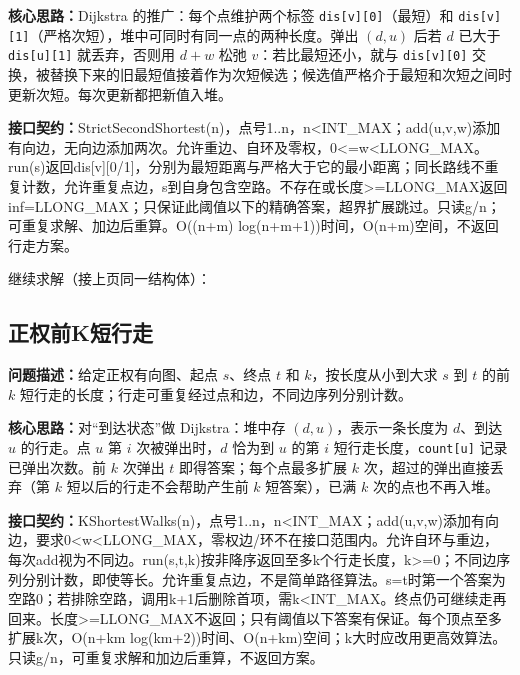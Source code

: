 \textbf{核心思路：}\allowbreak Dijkstra 的推广：每个点维护两个标签 \texttt{dis[v][0]}（最短）和 \texttt{dis[v][1]}（严格次短），堆中可同时有同一点的两种长度。弹出 $(d,u)$ 后若 $d$ 已大于 \texttt{dis[u][1]} 就丢弃，否则用 $d+w$ 松弛 $v$：若比最短还小，就与 \texttt{dis[v][0]} 交换，被替换下来的旧最短值接着作为次短候选；候选值严格介于最短和次短之间时更新次短。每次更新都把新值入堆。



{\sloppy{}\noindent\textbf{接口契约：}StrictSecondShortest(n)，点号1..n，n<INT\_MAX；add(u,v,w)添加有向边，无向边添加两次。允许重边、自环及零权，0<=w<LLONG\_MAX。run(s)返回dis[v][0/1]，分别为最短距离与严格大于它的最小距离；同长路线不重复计数，允许重复点边，s到自身包含空路。不存在或长度>=LLONG\_MAX返回inf=LLONG\_MAX；只保证此阈值以下的精确答案，超界扩展跳过。只读g/n；可重复求解、加边后重算。O((n+m) log(n+m+1))时间，O(n+m)空间，不返回行走方案。\par}

\Needspace{281pt}



\newpage

\noindent 继续求解（接上页同一结构体）：



\subsection{正权前K短行走}\label{compact-KShortestWalks}

\noindent\textbf{问题描述：}\allowbreak 给定正权有向图、起点 $s$、终点 $t$ 和 $k$，按长度从小到大求 $s$ 到 $t$ 的前 $k$ 短行走的长度；行走可重复经过点和边，不同边序列分别计数。

\textbf{核心思路：}\allowbreak 对“到达状态”做 Dijkstra：堆中存 $(d,u)$，表示一条长度为 $d$、到达 $u$ 的行走。点 $u$ 第 $i$ 次被弹出时，$d$ 恰为到 $u$ 的第 $i$ 短行走长度，\texttt{count[u]} 记录已弹出次数。前 $k$ 次弹出 $t$ 即得答案；每个点最多扩展 $k$ 次，超过的弹出直接丢弃（第 $k$ 短以后的行走不会帮助产生前 $k$ 短答案），已满 $k$ 次的点也不再入堆。



{\sloppy{}\noindent\textbf{接口契约：}KShortestWalks(n)，点号1..n，n<INT\_MAX；add(u,v,w)添加有向边，要求0<w<LLONG\_MAX，零权边/环不在接口范围内。允许自环与重边，每次add视为不同边。run(s,t,k)按非降序返回至多k个行走长度，k>=0；不同边序列分别计数，即使等长。允许重复点边，不是简单路径算法。s=t时第一个答案为空路0；若排除空路，调用k+1后删除首项，需k<INT\_MAX。终点仍可继续走再回来。长度>=LLONG\_MAX不返回；只有阈值以下答案有保证。每个顶点至多扩展k次，O(n+km log(km+2))时间、O(n+km)空间；k大时应改用更高效算法。只读g/n，可重复求解和加边后重算，不返回方案。\par}

